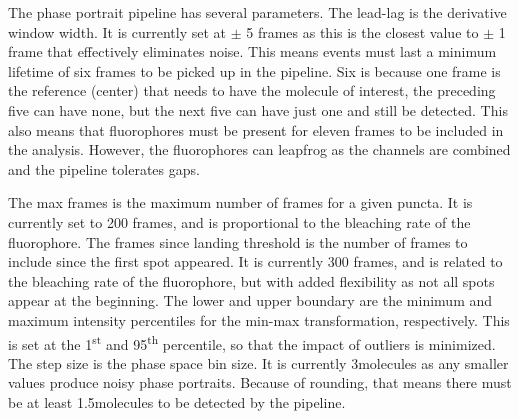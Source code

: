 The phase portrait pipeline has several parameters. The lead-lag is the derivative window width. It is currently set at $\pm$ 5 frames as this is the closest value to $\pm$ 1 frame that effectively eliminates noise. This means events must last a minimum lifetime of six frames to be picked up in the pipeline. Six is because one frame is the reference (center) that needs to have the molecule of interest, the preceding five can have none, but the next five can have just one and still be detected. This also means that fluorophores must be present for eleven frames to be included in the analysis. However, the fluorophores can leapfrog as the channels are combined and the pipeline tolerates gaps.

The max frames is the maximum number of frames for a given puncta. It is currently set to 200 frames, and is proportional to the bleaching rate of the fluorophore. The frames since landing threshold is the number of frames to include since the first spot appeared. It is currently 300 frames, and is related to the bleaching rate of the fluorophore, but with added flexibility as not all spots appear at the beginning. The lower and upper boundary are the minimum and maximum intensity percentiles for the min-max transformation, respectively. This is set at the 1\textsuperscript{st} and 95\textsuperscript{th} percentile, so that the impact of outliers is minimized. The step size is the phase space bin size. It is currently 3\times molecules as any smaller values produce noisy phase portraits. Because of rounding, that means there must be at least 1.5\times molecules to be detected by the pipeline.

